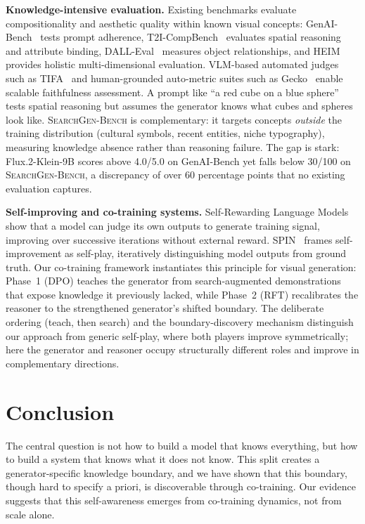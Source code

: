 \documentclass{article}
\newcommand{\bench}{\textsc{SearchGen-Bench}}
\begin{document}
\textbf{Knowledge-intensive evaluation.}
Existing benchmarks evaluate compositionality and aesthetic quality within known visual concepts: GenAI-Bench~\cite{genaibench} tests prompt adherence, T2I-CompBench~\cite{t2icompbench} evaluates spatial reasoning and attribute binding, DALL-Eval~\cite{dalleval} measures object relationships, and HEIM~\cite{lee2024heim} provides holistic multi-dimensional evaluation.
VLM-based automated judges such as TIFA~\cite{hu2023tifa} and human-grounded auto-metric suites such as Gecko~\cite{wiles2024gecko} enable scalable faithfulness assessment.
A prompt like ``a red cube on a blue sphere'' tests spatial reasoning but assumes the generator knows what cubes and spheres look like.
\bench{} is complementary: it targets concepts \emph{outside} the training distribution (cultural symbols, recent entities, niche typography), measuring knowledge absence rather than reasoning failure.
The gap is stark: Flux.2-Klein-9B scores above 4.0/5.0 on GenAI-Bench yet falls below 30/100 on \bench{}, a discrepancy of over 60 percentage points that no existing evaluation captures.

\textbf{Self-improving and co-training systems.}
Self-Rewarding Language Models~\cite{yuan2024selfrewarding} show that a model can judge its own outputs to generate training signal, improving over successive iterations without external reward.
SPIN~\cite{chen2024spin} frames self-improvement as self-play, iteratively distinguishing model outputs from ground truth. Our co-training framework instantiates this principle for visual generation: Phase~1 (DPO) teaches the generator from search-augmented demonstrations that expose knowledge it previously lacked, while Phase~2 (RFT) recalibrates the reasoner to the strengthened generator's shifted boundary.
The deliberate ordering (teach, then search) and the boundary-discovery mechanism distinguish our approach from generic self-play, where both players improve symmetrically; here the generator and reasoner occupy structurally different roles and improve in complementary directions.


\section{Conclusion}
\label{sec:conclusion}

The central question is not how to build a model that knows everything, but how to build a system that knows what it does not know. This split creates a generator-specific knowledge boundary, and we have shown that this boundary, though hard to specify a priori, is discoverable through co-training. Our evidence suggests that this self-awareness emerges from co-training dynamics, not from scale alone.
\end{document}
